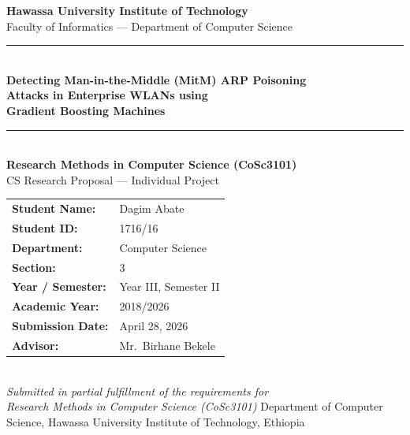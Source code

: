 \documentclass[12pt,a4paper]{article}
\begin{document}
\begin{titlepage}
    \centering
    \vspace*{1cm}
    {\Large \textbf{Hawassa University Institute of Technology}\\[4pt]
    Faculty of Informatics --- Department of Computer Science}\\[0.5cm]
    \rule{\linewidth}{0.5pt}\\[0.5cm]
    {\LARGE \textbf{Detecting Man-in-the-Middle (MitM) ARP Poisoning\\
    Attacks in Enterprise WLANs using\\
    Gradient Boosting Machines}}\\[0.5cm]
    \rule{\linewidth}{0.5pt}\\[0.8cm]
    {\large \textbf{Research Methods in Computer Science (CoSc3101)}\\[4pt]
    CS Research Proposal --- Individual Project}\\[1cm]
    \begin{tabular}{ll}
        \textbf{Student Name:}    & Dagim Abate                \\[4pt]
        \textbf{Student ID:}      & 1716/16                    \\[4pt]
        \textbf{Department:}      &  Computer Science       \\[4pt]
        \textbf{Section:}         & 3                           \\[4pt]
        \textbf{Year / Semester:} & Year III, Semester II      \\[4pt]
        \textbf{Academic Year:}   & 2018/2026                  \\[4pt]
        \textbf{Submission Date:} & April 28, 2026             \\[4pt]
        \textbf{Advisor:}         & Mr.\ Birhane Bekele        \\
    \end{tabular}\\[1.5cm]
    \textit{Submitted in partial fulfillment of the requirements for\\
    Research Methods in Computer Science (CoSc3101)}
    \vfill
    {\small Department of Computer Science, Hawassa University Institute of Technology, Ethiopia}
\end{titlepage}
\end{document}
